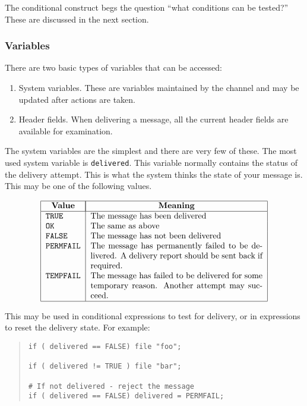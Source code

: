 The conditional construct begs the question ``what conditions can be
tested?'' These are discussed in the next section.

\subsubsection{Variables}

There are two basic types of variables that can be accessed:

\begin{enumerate}
\item	System variables. These are variables maintained by the  channel
and may be updated after actions are taken.

\item	Header fields. When delivering a message,
all the current header fields are available for examination.
\end{enumerate}

The system variables are the simplest and there are very few of these.
The most used system variable is \verb+delivered+.
This variable normally contains the status of the delivery attempt.
This is what the system thinks the state of your message is. This may
be one of the following values.

\[\begin{tabular}{|l | p{0.6\linewidth} |}
\hline
	\multicolumn{1}{|c|}{\bf Value} &
		\multicolumn{1}{|c|}{\bf Meaning} \\
\hline
	\tt TRUE &	The message has been delivered \\
	\tt OK &	The same as above \\
	\tt FALSE &	The message has not been delivered \\
	\tt PERMFAIL &	The message has permanently failed to be delivered.
			A delivery report should be sent back if required.\\
	\tt TEMPFAIL &	The message has failed to be delivered for
			some temporary reason. Another attempt may
			succeed. \\
\hline
\end{tabular}\]	

This may be used in conditional expressions to test for delivery, or
in expressions to reset the delivery state. For example:

\begin{quote}\small\begin{verbatim}
if ( delivered == FALSE) file "foo";

if ( delivered != TRUE ) file "bar";

# If not delivered - reject the message
if ( delivered == FALSE) delivered = PERMFAIL;
\end{verbatim}\end{quote}

